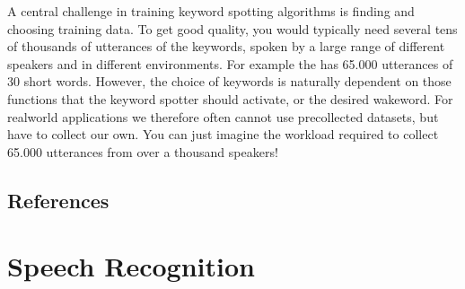 \documentclass[letterpaper,10pt,english]{jupyterBook}
\begin{document}
\sphinxAtStartPar
A central challenge in training keyword spotting algorithms is finding
and choosing training data. To get good quality, you would typically
need several tens of thousands of utterances of the keywords, spoken by
a large range of different speakers and in different environments. For
example the 
has 65.000 utterances of 30 short words. However, the choice of keywords
is naturally dependent on those functions that the keyword spotter
should activate, or the desired wake\sphinxhyphen{}word. For real\sphinxhyphen{}world applications
we therefore often cannot use pre\sphinxhyphen{}collected datasets, but have to
collect our own. You can just imagine the workload required to collect
65.000 utterances from over a thousand speakers!


\subsection{References}
\label{\detokenize{Recognition/Wake-word_and_keyword_spotting:references}}
\sphinxstepscope


\section{Speech Recognition}
\label{\detokenize{Recognition/Speech_Recognition:speech-recognition}}\label{\detokenize{Recognition/Speech_Recognition::doc}}
\end{document}
